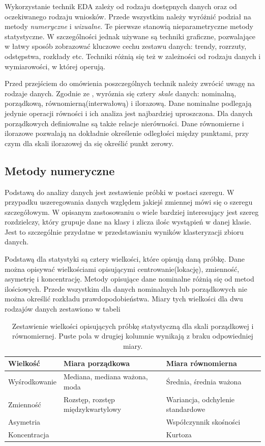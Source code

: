 \documentclass[12pt,a4paper,oneside]{report} %
\begin{document}
Wykorzystanie technik EDA zależy od rodzaju dostępnych danych oraz od oczekiwanego rodzaju wniosków. Przede wszystkim należy wyróżnić podział na metody \emph{numeryczne} i \emph{wizualne}. Te pierwsze stanowią nieparametryczne metody statystyczne. W szczególności jednak używane są techniki graficzne, pozwalające w łatwy sposób zobrazować kluczowe cechu zestawu danych: trendy, rozrzuty, odstępstwa, rozkłady etc. Techniki różnią się też w zależności od rodzaju danych i wymiarowości, w której operują.\par

Przed przejściem do omówienia poszczególnych technik należy zwrócić uwagę na rodzaje danych. Zgodnie ze \cite{stanisz-1}, wyróznia się cztery \emph{skale} danych: nominalną, porządkową, równomierną(interwałową) i ilorazową. Dane nominalne podlegają jedynie operacji równości i ich analiza jest najbardziej uproszczona. Dla danych porządkowych definiowalne są także relacje nierówności. Dane równomierne i ilorazowe pozwalają na dokładnie określenie odległości między punktami, przy czym dla skali ilorazowej da się określić punkt zerowy.\par

\subsection{Metody numeryczne}

Podstawą do analizy danych jest zestawienie próbki w postaci szeregu. W przypadku uszeregowania danych względem jakiejś zmiennej mówi się o szeregu szczegółowym. W opisanym zastosowaniu o wiele bardziej interesujący jest szereg rozdzielczy, który grupuje dane na klasy i zlicza ilośc wystąpień w danej klasie. Jest to szczególnie przydatne w przedstawianiu wyników klasteryzacji zbioru danych. \par

Podstawą dla statystyki są cztery wielkości, które opisują daną próbkę. Dane można opisywać wielkościami opisującymi centrowanie(lokację), zmienność, asymetrię i koncentrację. \cite{stanisz-1} Metody opisujące dane nominalne różnią się od metod ilościowych. Przede wszystkim dla danych nominalnych lub porządkowych nie można określić rozkładu prawdopodobieństwa. Miary tych wielkości dla dwu rodzajów danych zestawiono w tabeli \cite{miary-statystyczne} 

\begin{table}
\begin{tabular}{l|l|l}
Wielkość & Miara porządkowa & Miara równomierna  \\
\hline
Wyśrodkowanie & Mediana, mediana ważona, moda & Średnia, średnia ważona \\
Zmienność & Rozstęp, rozstęp międzykwartylowy & Wariancja, odchylenie standardowe \\
Asymetria &  & Współczynnik skośności \\
Koncentracja &  & Kurtoza \\
\end{tabular}
\caption{Zestawienie wielkości opisujących próbkę statystyczną dla skali porządkowej i równomiernej. Puste pola w drugiej kolumnie wynikają z braku odpowiedniej miary.}
\label{miary-statystyczne}
\end{table}
\end{document}
